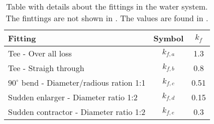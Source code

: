 \begin{table}[]
\centering
\begin{tabular}{l|c|c}
Fitting 									  & Symbol 	  & $k_f$   \\ \hline
Tee - Over all loss							  & $k_{f,a}$ & 1.3 	\\
Tee - Straigh through						  & $k_{f,b}$ & 0.8 	\\
$90^\circ$ bend - Diameter/radious ration 1:1 & $k_{f,c}$ & 0.51	\\
Sudden enlarger - Diameter ratio 1:2		  & $k_{f,d}$ & 0.15	\\
Sudden contractor - Diameter ratio 1:2		  & $k_{f,e}$ & 0.3 	
\end{tabular}
\caption{Table with details about the fittings in the water system. The finttings are not shown in . The values are found in \citep{Polypipe,PEPS}.}
\label{tab:pip_detail}
\end{table}

